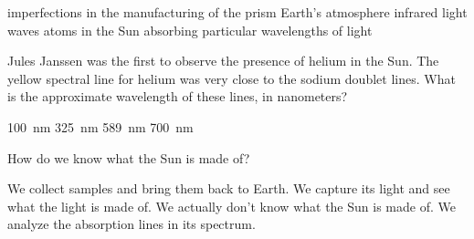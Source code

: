 \documentclass[addpoints]{exam}
\begin{document}
\begin{questions}
\begin{choices}
    \choice imperfections in the manufacturing of the prism
    \choice Earth's atmosphere 
    \choice infrared light waves
    \correctchoice atoms in the Sun absorbing particular wavelengths of light
\end{choices}

\question
Jules Janssen was the first to observe the presence of helium in the Sun. The yellow spectral line for helium was very close to the sodium doublet lines. What is the approximate wavelength of these lines, in nanometers?

\begin{choices}
    \choice \SI{100}{nm}
    \choice \SI{325}{nm}
    \correctchoice \SI{589}{nm}
    \choice \SI{700}{nm}
\end{choices}

\question
How do we know what the Sun is made of?

\begin{choices}
    \choice We collect samples and bring them back to Earth.
    \choice We capture its light and see what the light is made of.
    \choice We actually don't know what the Sun is made of.
    \correctchoice We analyze the absorption lines in its spectrum.
\end{choices}


\end{questions}
\end{document}
